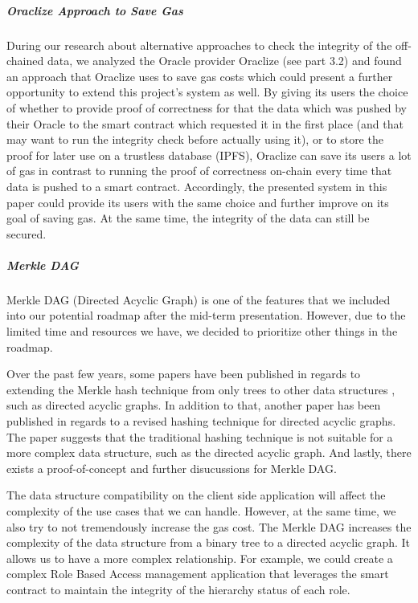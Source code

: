 \subparagraph{Oraclize Approach to Save Gas}
During our research about alternative approaches to check the integrity of the off-chained data, we analyzed the Oracle provider Oraclize (see part 3.2) and found an approach that Oraclize uses to save gas costs which could present a further opportunity to extend this project’s system as well. By giving its users the choice of whether to provide proof of correctness for that the data which was pushed by their Oracle to the smart contract which requested it in the first place (and that may want to run the integrity check before actually using it), or to store the proof for later use on a trustless database (IPFS), Oraclize can save its users a lot of gas in contrast to running the proof of correctness on-chain every time that data is pushed to a smart contract. Accordingly, the presented system in this paper could provide its users with the same choice and further improve on its goal of saving gas. At the same time, the integrity of the data can still be secured.

\subparagraph{Merkle DAG}
Merkle DAG (Directed Acyclic Graph) is one of the features that we included into our potential roadmap after the mid-term presentation. However, due to the limited time and resources we have, we decided to prioritize other things in the roadmap.

Over the past few years, some papers have been published in regards to extending the Merkle hash technique from only trees to other data structures \cite{Martel2004}, such as directed acyclic graphs. In addition to that, another paper has been published in regards to a revised hashing technique \cite{kundu2012hashing} for directed acyclic graphs. The paper suggests that the traditional hashing technique is not suitable for a more complex data structure, such as the directed acyclic graph. And lastly, there exists a proof-of-concept \cite{futureWork02} and further disucussions for Merkle DAG. 

The data structure compatibility on the client side application will affect the complexity of the use cases that we can handle. However, at the same time, we also try to not tremendously increase the gas cost. The Merkle DAG increases the complexity of the data structure from a binary tree to a directed acyclic graph. It allows us to have a more complex relationship. For example, we could create a complex Role Based Access management application that leverages the smart contract to maintain the integrity of the hierarchy status of each role.

